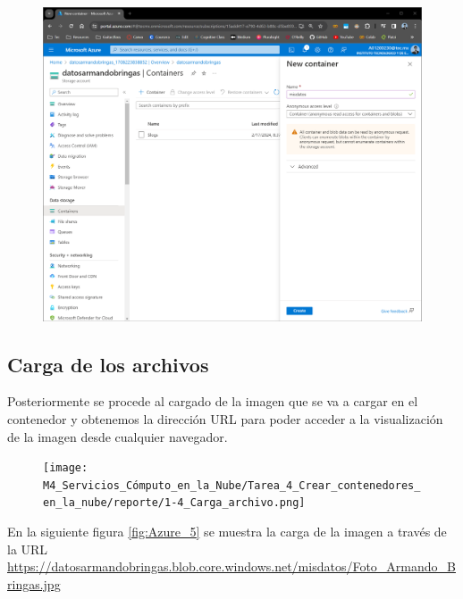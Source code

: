 \documentclass[12pt,a4paper]{article}
\begin{document}
\begin{figure}[H]
    \centering
    \includegraphics[width=1\linewidth]{M4_Servicios_Cómputo_en_la_Nube/Tarea_4_Crear_contenedores_en_la_nube/reporte/1-3_Configuración_contenedor_público.png}
    \label{fig:Azure_3}
\end{figure}

\vspace{3cm}

\subsection{Carga de los archivos}

Posteriormente se procede al cargado de la imagen que se va a cargar en el contenedor y obtenemos la dirección URL para poder acceder a la visualización de la imagen desde cualquier navegador.

\begin{figure}[H]
    \centering
    \texttt{[image: M4\_Servicios\_Cómputo\_en\_la\_Nube/Tarea\_4\_Crear\_contenedores\_en\_la\_nube/reporte/1-4\_Carga\_archivo.png]}
    \label{fig:Azure_4}
\end{figure}

\vspace{5cm}

En la siguiente figura \ref{fig:Azure_5} se muestra la carga de la imagen a través de la URL \url{https://datosarmandobringas.blob.core.windows.net/misdatos/Foto_Armando_Bringas.jpg}
\end{document}
